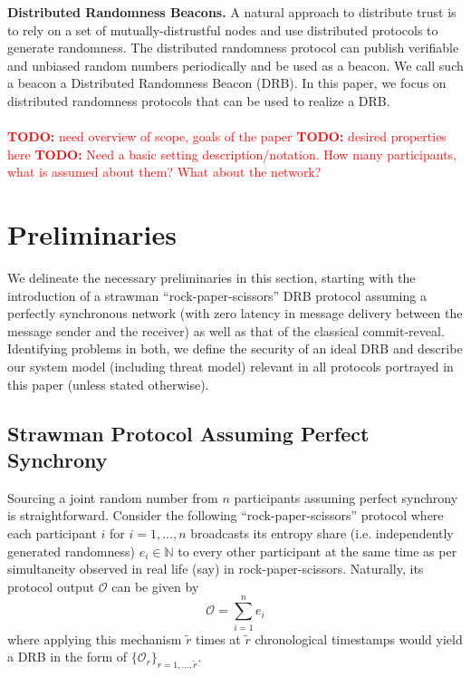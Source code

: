 \documentclass[letterpaper,twocolumn,10pt]{article}
\theoremstyle{definition}
\theoremstyle{remark}
\newcommand{\todo}[1]{\textcolor{red}{\textbf{TODO:} #1}}
\begin{document}
\textbf{Distributed Randomness Beacons.} 
A natural approach to distribute trust is to rely on a set of mutually-distrustful nodes and use distributed protocols to generate randomness. The distributed randomness protocol can publish verifiable and unbiased random numbers periodically and be used as a beacon. We call such a beacon a Distributed Randomness Beacon (DRB). In this paper, we focus on distributed randomness protocols that can be used to realize a DRB.\\\\

\todo{need overview of scope, goals of the paper}
\todo{desired properties here}
\todo{Need a basic setting description/notation. How many participants, what is assumed about them? What about the network?}



\section{Preliminaries}
We delineate the necessary preliminaries in this section, starting with the introduction of a strawman ``rock-paper-scissors'' DRB protocol assuming a perfectly synchronous network (with zero latency in message delivery between the message sender and the receiver) as well as that of the classical commit-reveal. Identifying problems in both, we define the security of an ideal DRB and describe our system model (including threat model) relevant in all protocols portrayed in this paper (unless stated otherwise).

\subsection{Strawman Protocol Assuming Perfect Synchrony}
Sourcing a joint random number from $n$ participants assuming perfect synchrony is straightforward. Consider the following ``rock-paper-scissors'' protocol where each participant $i$ for $i = 1, ..., n$ broadcasts its entropy share (i.e. independently generated randomness) $e_i \in \mathbb{N}$ to every other participant at the same time as per simultaneity observed in real life (say) in rock-paper-scissors. Naturally, its protocol output $\mathcal{O}$ can be given by
\[
\mathcal{O} = \sum_{i = 1}^n e_i
\]
where applying this mechanism $\tilde{r}$ times at $\tilde{r}$ chronological timestamps would yield a DRB in the form of $\{\mathcal{O}_r\}_{r = 1, ..., \tilde{r}}$.
\end{document}
